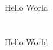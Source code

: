 \documentclass[12pt,letterpaper]{article}
\begin{document}
\setcounter{section}{23}
\section{}
Hello World

\section{}
Hello World
\end{document}
